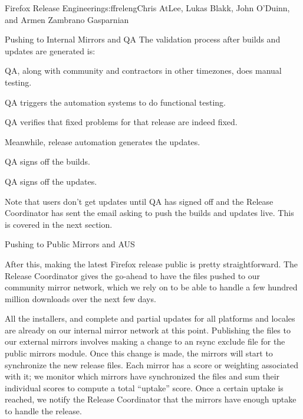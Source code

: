 \begin{aosachapter}{Firefox Release Engineering}{s:ffreleng}{Chris AtLee, Lukas Blakk, John O'Duinn, and Armen Zambrano Gasparnian}
\begin{aosasect1}{Pushing to Internal Mirrors and QA}
The validation process after builds and updates are generated is:

\begin{aosaitemize}

\item QA, along with community and contractors in other timezones, does
  manual testing.

\item QA triggers the automation systems to do functional testing.

\item QA verifies that fixed problems for that release are indeed
  fixed.

\item Meanwhile, release automation generates the updates.

\item QA signs off the builds.

\item QA signs off the updates.

\end{aosaitemize}
  
Note that users don't get updates until QA has signed off and the
Release Coordinator has sent the email asking to push the builds and
updates live. This is covered in the next section.
 
\end{aosasect1}

\begin{aosasect1}{Pushing to Public Mirrors and AUS}

After this, making the latest Firefox release public is pretty
straightforward. The Release Coordinator gives the go-ahead to have
the files pushed to our community mirror network, which we rely on
to be able to handle a few hundred million 
downloads over the next few days. 

All the installers, and 
complete and partial updates for all platforms and locales are already
on our internal mirror network at this point. Publishing the files to
our external mirrors involves making a change to an rsync exclude file for the
public mirrors module.  Once this change is made, the mirrors will
start to synchronize the new release files. Each mirror has a score or
weighting associated with it; we monitor which mirrors have
synchronized the files and sum their individual scores to compute a
total ``uptake'' score. Once a certain uptake is reached, we notify
the Release Coordinator that the mirrors have enough uptake to handle
the release.


\end{aosasect1}
\end{aosachapter}
